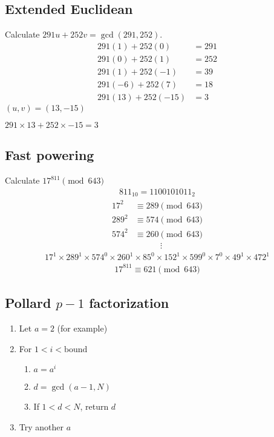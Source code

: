 \documentclass{article}
\begin{document}
\subsection*{Extended Euclidean}
Calculate $291u + 252v = \gcd(291, 252)$.
\begin{align*}
    291(1)  + 252(0)   &= 291 \\
    291(0)  + 252(1)   &= 252 \\
    291(1)  + 252(-1)  &= 39  \\
    291(-6) + 252(7)   &= 18  \\
    291(13) + 252(-15) &= 3
\end{align*}
$(u, v) = (13, -15)$

$291 \times 13 + 252 \times -15 = 3$

\subsection*{Fast powering}
Calculate $17^{811} \pmod{643}$
\begin{align*}
    811_{10} = 1100101011_2
\end{align*}
\begin{align*}
    17^2 &\equiv 289 \pmod{643} \\
    289^2 &\equiv 574 \pmod{643} \\
    574^2 &\equiv 260 \pmod{643} \\
    & \qquad \quad \vdots
\end{align*}
\begin{align*}
    17^{1} \times 289^{1} \times 574^{0} \times 260^{1} \times 85^{0} \times 152^{1} \times 599^{0} \times 7^{0} \times 49^{1} \times 472^{1}
\end{align*}
\begin{align*}
    17^{811} \equiv 621 \pmod{643}
\end{align*}

\subsection*{Pollard $p-1$ factorization}
\begin{enumerate}
    \item Let $a = 2$ (for example)
    \item For $1 < i < \text{bound}$
    \begin{enumerate}
        \item $a = a^i$
        \item $d = \gcd(a - 1, N)$
        \item If $1 < d < N$, return $d$
    \end{enumerate}
    \item Try another $a$
\end{enumerate}
\end{document}
